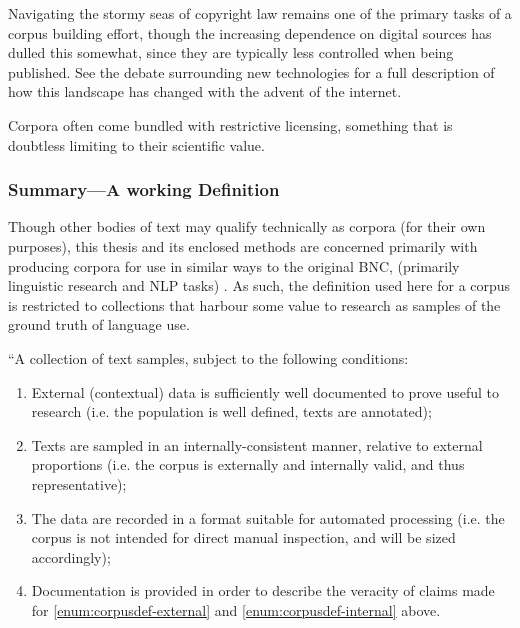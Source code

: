 Navigating the stormy seas of copyright law remains one of the primary tasks of a corpus building effort, though the increasing dependence on digital sources has dulled this somewhat, since they are typically less controlled when being published.  See the debate surrounding new technologies for a full description of how this landscape has changed with the advent of the internet.

Corpora often come bundled with restrictive licensing, something that is doubtless limiting to their scientific value.  %



\subsubsection{Summary---A working Definition}
Though other bodies of text may qualify technically as corpora (for their own purposes), this thesis and its enclosed methods are concerned primarily with producing corpora for use in similar ways to the original BNC, (primarily linguistic research and NLP tasks) %
.  As such, the definition used here for a corpus is restricted to collections that harbour some value to research as samples of the ground truth of language use.

``A collection of text samples, subject to the following conditions:

\begin{enumerate}
    \item \label{enum:corpusdef-external} External (contextual) data is sufficiently well documented to prove useful to research (i.e. the population is well defined, texts are annotated);
    \item \label{enum:corpusdef-internal} Texts are sampled in an internally-consistent manner, relative to external proportions (i.e. the corpus is externally and internally valid, and thus representative);
    \item The data are recorded in a format suitable for automated processing (i.e. the corpus is not intended for direct manual inspection, and will be sized accordingly);
    \item Documentation is provided in order to describe the veracity of claims made for \ref{enum:corpusdef-external} and \ref{enum:corpusdef-internal} above.
\end{enumerate}


